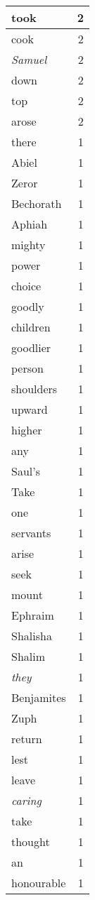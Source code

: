 \begin{center}
\begin{longtable}{l|r}
took & 2 \\ \hline
cook & 2 \\ \hline
\emph{Samuel} & 2 \\ \hline
down & 2 \\ \hline
top & 2 \\ \hline
arose & 2 \\ \hline
there & 1 \\ \hline
Abiel & 1 \\ \hline
Zeror & 1 \\ \hline
Bechorath & 1 \\ \hline
Aphiah & 1 \\ \hline
mighty & 1 \\ \hline
power & 1 \\ \hline
choice & 1 \\ \hline
goodly & 1 \\ \hline
children & 1 \\ \hline
goodlier & 1 \\ \hline
person & 1 \\ \hline
shoulders & 1 \\ \hline
upward & 1 \\ \hline
higher & 1 \\ \hline
any & 1 \\ \hline
Saul's & 1 \\ \hline
Take & 1 \\ \hline
one & 1 \\ \hline
servants & 1 \\ \hline
arise & 1 \\ \hline
seek & 1 \\ \hline
mount & 1 \\ \hline
Ephraim & 1 \\ \hline
Shalisha & 1 \\ \hline
Shalim & 1 \\ \hline
\emph{they} & 1 \\ \hline
Benjamites & 1 \\ \hline
Zuph & 1 \\ \hline
return & 1 \\ \hline
lest & 1 \\ \hline
leave & 1 \\ \hline
\emph{caring} & 1 \\ \hline
take & 1 \\ \hline
thought & 1 \\ \hline
an & 1 \\ \hline
honourable & 1 \\ \hline

\end{longtable}
\end{center}
